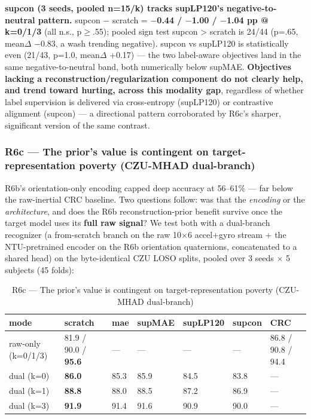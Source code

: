 \textbf{supcon (3 seeds, pooled n=15/k) tracks supLP120's negative-to-neutral pattern.} supcon $-$ scratch = \textbf{$-$0.44 / $-$1.00 / $-$1.04 pp @ k=0/1/3} (all n.s., p$\ge$.55); pooled sign test supcon > scratch is 24/44 (p=.65, mean$\Delta$ $-$0.83, a wash trending negative). supcon vs supLP120 is statistically even (21/43, p=1.0, mean$\Delta$ +0.17) --- the two label-aware objectives land in the same negative-to-neutral band, both numerically below supMAE. \textbf{Objectives lacking a reconstruction/regularization component do not clearly help, and trend toward hurting, across this modality gap}, regardless of whether label supervision is delivered via cross-entropy (supLP120) or contrastive alignment (supcon) --- a directional pattern corroborated by R6c's sharper, significant version of the same contrast.

\subsubsection{R6c --- The prior's value is contingent on target-representation poverty (CZU-MHAD dual-branch)}

R6b's orientation-only encoding capped deep accuracy at 56--61\% --- far below the raw-inertial CRC baseline. Two questions follow: was that the \textit{encoding} or the \textit{architecture}, and does the R6b reconstruction-prior benefit survive once the target model uses its \textbf{full raw signal}? We test both with a dual-branch recognizer (a from-scratch branch on the raw 10$\times$6 accel+gyro stream + the NTU-pretrained encoder on the R6b orientation quaternions, concatenated to a shared head) on the byte-identical CZU LOSO splits, pooled over 3 seeds $\times$ 5 subjects (45 folds):

\begin{table}[!t]
\centering
\caption{R6c --- The prior's value is contingent on target-representation poverty (CZU-MHAD dual-branch)}
\small
\begin{tabular}{lllllll}
\toprule
mode & scratch & mae & supMAE & supLP120 & supcon & CRC \\
\midrule
raw-only (k=0/1/3) & 81.9 / 90.0 / \textbf{95.6} & --- & --- & --- & --- & 86.8 / 90.8 / 94.4 \\
dual (k=0) & \textbf{86.0} & 85.3 & 85.9 & 84.5 & 83.8 & --- \\
dual (k=1) & \textbf{88.8} & 88.0 & 88.5 & 87.2 & 86.9 & --- \\
dual (k=3) & \textbf{91.9} & 91.4 & 91.6 & 90.9 & 90.0 & --- \\
\bottomrule
\end{tabular}
\end{table}

